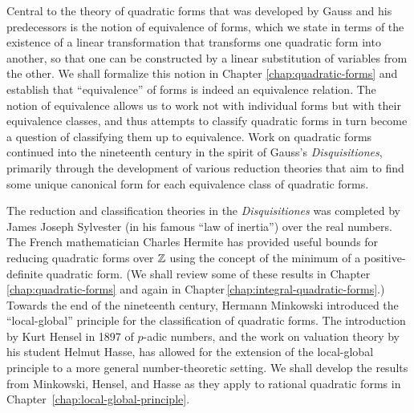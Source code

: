 Central to the theory of quadratic forms that was developed by Gauss and his
predecessors is the notion of equivalence of forms, which we state in terms of
the existence of a linear transformation that transforms one quadratic form into
another, so that one can be constructed by a linear substitution of variables
from the other. We shall formalize this notion in Chapter
\ref{chap:quadratic-forms} and establish that ``equivalence'' of forms is indeed
an equivalence relation. The notion of equivalence allows us to work not with
individual forms but with their equivalence classes, and thus attempts to
classify quadratic forms in turn become a question of classifying them up to
equivalence. Work on quadratic forms continued into the nineteenth century in
the spirit of Gauss's \emph{Disquisitiones}, primarily through the development
of various reduction theories that aim to find some unique canonical form for
each equivalence class of quadratic forms.

The reduction and classification theories in the \emph{Disquisitiones} was
completed by James Joseph Sylvester (in his famous ``law of inertia'') over the
real numbers. The French mathematician Charles Hermite has provided useful
bounds for reducing quadratic forms over \(\mathbb{Z}\) using the concept of the
minimum of a positive-definite quadratic form. \cite{gerstein2008basic} (We
shall review some of these results in Chapter \ref{chap:quadratic-forms} and
again in Chapter\,\ref{chap:integral-quadratic-forms}.) Towards the end of the
nineteenth century, Hermann Minkowski introduced the ``local-global'' principle
for the classification of quadratic forms. The introduction by Kurt Hensel in
1897 of \(p\)-adic numbers, and the work on valuation theory by his student
Helmut Hasse, has allowed for the extension of the local-global principle to a
more general number-theoretic setting.
\cite{gerstein2008basic,hensel1913zahlentheorie,hasse1922uber} We shall develop
the results from Minkowski, Hensel, and Hasse as they apply to rational
quadratic forms in Chapter \,\ref{chap:local-global-principle}.

